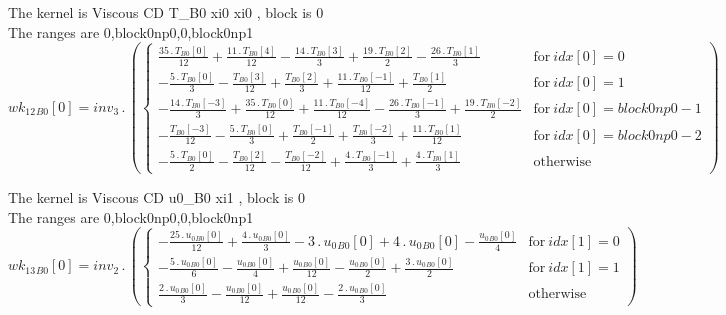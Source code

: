 \documentclass{article}
\begin{document}
\noindent The kernel is Viscous CD T_B0 xi0 xi0 , block is 0\\\noindent The ranges are 0,block0np0,0,block0np1\\\begin{dmath}{wk_{12}{_{B0}}}[{0}] = inv_3 \,.\, \left(\begin{cases} \frac{35 \,.\, {T{_{B0}}}[{0}]}{12} + \frac{11 \,.\, {T{_{B0}}}[{4}]}{12} - \frac{14 \,.\, {T{_{B0}}}[{3}]}{3} + \frac{19 \,.\, {T{_{B0}}}[{2}]}{2} - \frac{26 \,.\, 
{T{_{B0}}}[{1}]}{3} & \text{for}\: {idx}[{0}] = 0 \\- \frac{5 \,.\, {T{_{B0}}}[{0}]}{3} - \frac{{T{_{B0}}}[{3}]}{12} + \frac{{T{_{B0}}}[{2}]}{3} + \frac{11 \,.\, {T{_{B0}}}[{-1}]}{12} + \frac{{T{_{B0}}}[{1}]}{2} & \text{for}\: {idx}[{0}] = 1 \\- 
\frac{14 \,.\, {T{_{B0}}}[{-3}]}{3} + \frac{35 \,.\, {T{_{B0}}}[{0}]}{12} + \frac{11 \,.\, {T{_{B0}}}[{-4}]}{12} - \frac{26 \,.\, {T{_{B0}}}[{-1}]}{3} + \frac{19 \,.\, {T{_{B0}}}[{-2}]}{2} & \text{for}\: {idx}[{0}] = block0np0 - 1 \\- 
\frac{{T{_{B0}}}[{-3}]}{12} - \frac{5 \,.\, {T{_{B0}}}[{0}]}{3} + \frac{{T{_{B0}}}[{-1}]}{2} + \frac{{T{_{B0}}}[{-2}]}{3} + \frac{11 \,.\, {T{_{B0}}}[{1}]}{12} & \text{for}\: {idx}[{0}] = block0np0 - 2 \\- \frac{5 \,.\, {T{_{B0}}}[{0}]}{2} - 
\frac{{T{_{B0}}}[{2}]}{12} - \frac{{T{_{B0}}}[{-2}]}{12} + \frac{4 \,.\, {T{_{B0}}}[{-1}]}{3} + \frac{4 \,.\, {T{_{B0}}}[{1}]}{3} & \text{otherwise} \end{cases}\right)\end{dmath}

\noindent The kernel is Viscous CD u0_B0 xi1 , block is 0\\\noindent The ranges are 0,block0np0,0,block0np1\\\begin{dmath}{wk_{13}{_{B0}}}[{0}] = inv_2 \,.\, \left(\begin{cases} - \frac{25 \,.\, {u_{0}{_{B0}}}[{0}]}{12} + \frac{4 \,.\, {u_{0}{_{B0}}}[{0}]}{3} - 3 \,.\, {u_{0}{_{B0}}}[{0}] + 4 \,.\, {u_{0}{_{B0}}}[{0}] - \frac{{u_{0}{_{B0}}}[{0}]}{4} & 
\text{for}\: {idx}[{1}] = 0 \\- \frac{5 \,.\, {u_{0}{_{B0}}}[{0}]}{6} - \frac{{u_{0}{_{B0}}}[{0}]}{4} + \frac{{u_{0}{_{B0}}}[{0}]}{12} - \frac{{u_{0}{_{B0}}}[{0}]}{2} + \frac{3 \,.\, {u_{0}{_{B0}}}[{0}]}{2} & \text{for}\: {idx}[{1}] = 1 \\\frac{2 
\,.\, {u_{0}{_{B0}}}[{0}]}{3} - \frac{{u_{0}{_{B0}}}[{0}]}{12} + \frac{{u_{0}{_{B0}}}[{0}]}{12} - \frac{2 \,.\, {u_{0}{_{B0}}}[{0}]}{3} & \text{otherwise} \end{cases}\right)\end{dmath}
\end{document}
